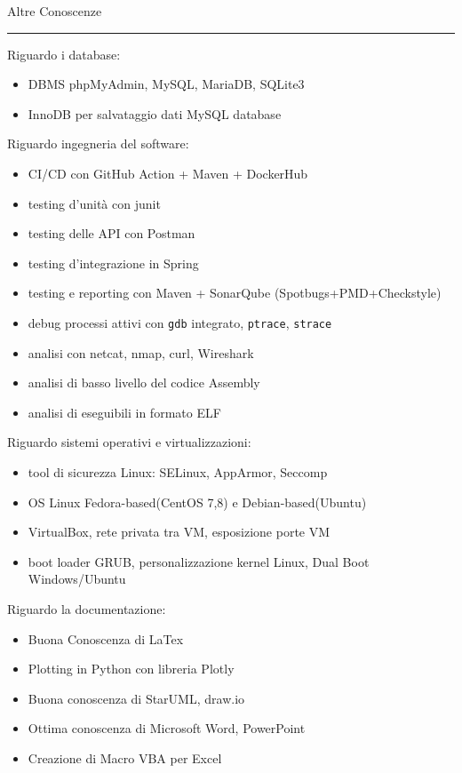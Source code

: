 \documentclass[a4paper]{letter}
\begin{document}
\hfill
\begin{minipage}[t]{0.65\textwidth}
\setlength{\baselineskip}{1.4\baselineskip}

\vspace{2 mm}
{\large Altre Conoscenze}
\rule{\linewidth}{0.4pt}
\vspace{1 mm}
{\medium Riguardo i database: }
\begin{itemize}
    \item DBMS phpMyAdmin, MySQL, MariaDB, SQLite3
    \item InnoDB per salvataggio dati MySQL database
\end{itemize}
\vspace{1 mm}
{\medium Riguardo ingegneria del software: }
\begin{itemize}
    \item CI/CD con GitHub Action + Maven + DockerHub
    \item testing d'unità con junit
    \item testing delle API con Postman
    \item testing d'integrazione in Spring
    \item testing e reporting con Maven + SonarQube (Spotbugs+PMD+Checkstyle)
    \item debug processi attivi con \texttt{gdb} integrato, \texttt{ptrace}, \texttt{strace}
    \item analisi con netcat, nmap, curl, Wireshark
    \item analisi di basso livello del codice Assembly
    \item analisi di eseguibili in formato ELF
\end{itemize}
\vspace{1 mm}
{\medium Riguardo sistemi operativi e virtualizzazioni: }
\begin{itemize}
    \item tool di sicurezza Linux: SELinux, AppArmor, Seccomp
    \item OS Linux Fedora-based(CentOS 7,8) e Debian-based(Ubuntu)  
    \item VirtualBox, rete privata tra VM, esposizione porte VM
    \item boot loader GRUB, personalizzazione kernel Linux, Dual Boot Windows/Ubuntu
\end{itemize}
\vspace{1 mm}
{\medium Riguardo la documentazione: }
\begin{itemize}
    \item Buona Conoscenza di LaTex
    \item Plotting in Python con libreria Plotly
    \item Buona conoscenza di StarUML, draw.io 
    \item Ottima conoscenza di Microsoft Word, PowerPoint
    \item Creazione di Macro VBA per Excel
\end{itemize}

\end{minipage}
\end{document}
